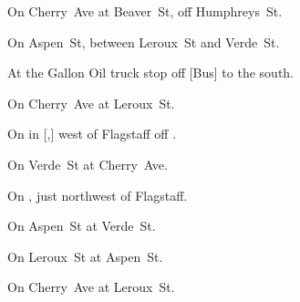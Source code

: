 
\begin{LocationList}

On Cherry~Ave at Beaver~St, off  Humphreys~St.

On Aspen~St, between Leroux~St and Verde~St.

At the Gallon Oil truck stop off [Bus] to the south.

\Location{\GarageHQ \Garage}
On Cherry~Ave at Leroux~St.

On  in [,] west of Flagstaff off  .

On Verde~St at Cherry~Ave.

On , just northwest of Flagstaff.

On Aspen~St at Verde~St.

On Leroux~St at Aspen~St.

On Cherry~Ave at Leroux~St.

\end{LocationList}
